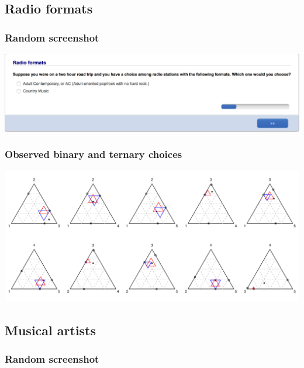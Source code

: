 \documentclass[11pt,letter]{article}
\begin{document}
\pagebreak

\subsection*{Radio formats}



\subsubsection*{Random screenshot}

\includegraphics[width=15cm]{Population_study_design/screenshot_Radio_Formats.png}

\subsubsection*{Observed binary and ternary choices}

\includegraphics[width=15cm]{./Population_study_data/Simplexes/Radio_formats.pdf}

\pagebreak

\subsection*{Musical artists}



\subsubsection*{Random screenshot}
\end{document}
